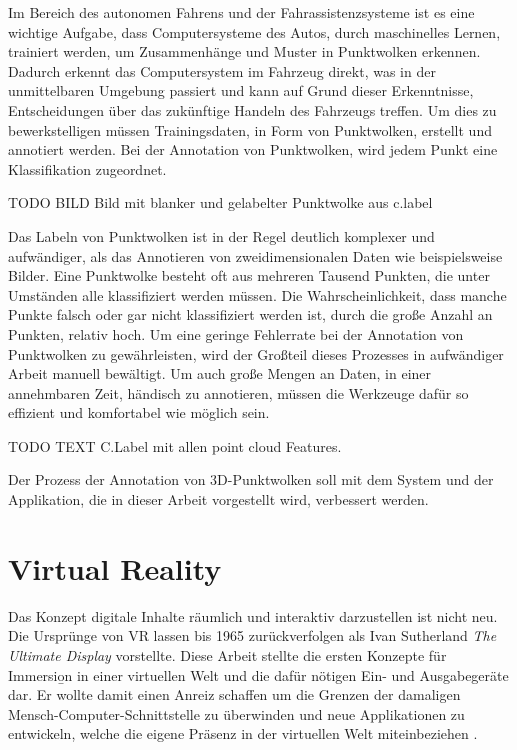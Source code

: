 Im Bereich des autonomen Fahrens und der Fahrassistenzsysteme ist es eine wichtige Aufgabe, dass Computersysteme des Autos, durch maschinelles Lernen, trainiert werden, um Zusammenhänge und Muster in Punktwolken erkennen. Dadurch erkennt das Computersystem im Fahrzeug direkt, was in der unmittelbaren Umgebung passiert und kann auf Grund dieser Erkenntnisse, Entscheidungen über das zukünftige Handeln des Fahrzeugs treffen. Um dies zu bewerkstelligen müssen Trainingsdaten, in Form von Punktwolken, erstellt und annotiert werden. Bei der Annotation von Punktwolken, wird jedem Punkt eine Klassifikation zugeordnet. 

TODO BILD Bild mit blanker und gelabelter Punktwolke aus c.label

Das Labeln von Punktwolken ist in der Regel deutlich komplexer und aufwändiger, als das Annotieren von zweidimensionalen Daten wie beispielsweise Bilder. Eine Punktwolke besteht oft aus mehreren Tausend Punkten, die unter Umständen alle klassifiziert werden müssen. Die Wahrscheinlichkeit, dass manche Punkte falsch oder gar nicht klassifiziert werden ist, durch die große Anzahl an Punkten, relativ hoch. Um eine geringe Fehlerrate bei der Annotation von Punktwolken zu gewährleisten, wird der Großteil dieses Prozesses in aufwändiger Arbeit manuell bewältigt. Um auch große Mengen an Daten, in einer annehmbaren Zeit, händisch zu annotieren, müssen die Werkzeuge dafür so effizient und komfortabel wie möglich sein.

TODO TEXT C.Label mit allen point cloud Features.

Der Prozess der Annotation von 3D-Punktwolken soll mit dem System und der Applikation, die in dieser Arbeit vorgestellt wird, verbessert werden.


\section{Virtual Reality}
\label{sec:VirtualReality}

Das Konzept digitale Inhalte räumlich und interaktiv darzustellen ist nicht neu. Die Ursprünge von VR lassen bis 1965 zurückverfolgen als Ivan Sutherland \glqq \textit{The Ultimate Display}\grqq \cite{bib:UltimateDisplay} vorstellte. Diese Arbeit stellte die ersten Konzepte für Immersio̱n in einer virtuellen Welt und die dafür nötigen Ein- und Ausgabegeräte dar. Er wollte damit einen Anreiz schaffen um die Grenzen der damaligen Mensch-Computer-Schnittstelle zu überwinden und neue Applikationen zu entwickeln, welche die eigene Präsenz in der virtuellen Welt miteinbeziehen \cite{bib:VRReport}.\\

